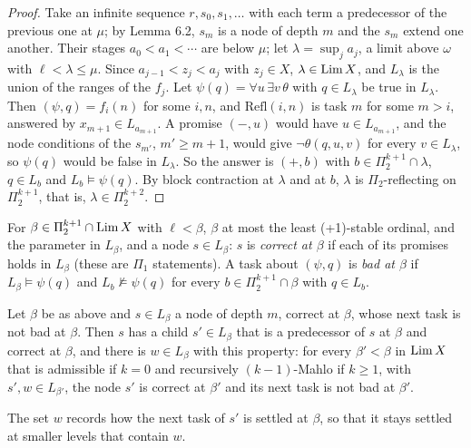 \documentclass[11pt]{article}
\begin{document}
\begin{proof}
Take an infinite sequence $r, s_0, s_1, \dots$ with each term a predecessor of the previous one at $\mu$; by Lemma 6.2,
$s_m$ is a node of depth $m$ and the $s_m$ extend one another. Their stages $a_0 < a_1 < \cdots$ are below $\mu$; let
$\lambda = \sup_j a_j$, a limit above $\omega$ with $\ell < \lambda \le \mu$. Since $a_{j-1} < z_j < a_j$ with $z_j \in
X$, $\lambda \in \mathrm{Lim}\, X$, and $L_\lambda$ is the union of the ranges of the $f_j$. Let $\psi(q) = \forall u\, \exists
v\, \theta$ with $q \in L_\lambda$ be true in $L_\lambda$. Then $(\psi, q) = f_i(n)$ for some $i, n$, and
$\mathrm{Refl}(i,n)$ is task $m$ for some $m > i$, answered by $x_{m+1} \in L_{a_{m+1}}$. A promise $(-, u)$ would have
$u \in L_{a_{m+1}}$, and the node conditions of the $s_{m'}$, $m' \ge m+1$, would give $\neg\theta(q, u, v)$ for every
$v \in L_\lambda$, so $\psi(q)$ would be false in $L_\lambda$. So the answer is $(+, b)$ with $b \in \Pi_2^{k+1} \cap
\lambda$, $q \in L_b$ and $L_b \models \psi(q)$. By block contraction at $\lambda$ and at $b$, $\lambda$ is
$\Pi_2$-reflecting on $\Pi_2^{k+1}$, that is, $\lambda \in \Pi_2^{k+2}$.
\end{proof}

For $\beta \in \Pi_2^{k+1} \cap \mathrm{Lim}\, X$ with $\ell < \beta$, $\beta$ at most the least (+1)-stable ordinal, and the
parameter in $L_\beta$, and a node $s \in
L_\beta$: $s$ is \emph{correct at $\beta$} if each of its promises holds in $L_\beta$ (these are $\Pi_1$ statements). A
task about $(\psi, q)$ is \emph{bad at $\beta$} if $L_\beta \models \psi(q)$ and $L_b \nvDash \psi(q)$ for every $b \in
\Pi_2^{k+1} \cap \beta$ with $q \in L_b$.

\begin{statement} Let $\beta$ be as above and $s \in L_\beta$ a node of depth $m$, correct
at $\beta$, whose next task is not bad at $\beta$. Then $s$ has a child $s' \in L_\beta$ that is a predecessor of $s$ at
$\beta$ and correct at $\beta$, and there is $w \in L_\beta$ with this property: for every $\beta' < \beta$ in
$\mathrm{Lim}\, X$ that is admissible if $k = 0$ and recursively $(k-1)$-Mahlo if $k \ge 1$, with $s', w \in L_{\beta'}$, the node $s'$ is correct at $\beta'$ and its next task is not bad
at $\beta'$.
\end{statement}

The set $w$ records how the next task of $s'$ is settled at $\beta$, so that it stays settled at smaller levels that
contain $w$.
\end{document}
